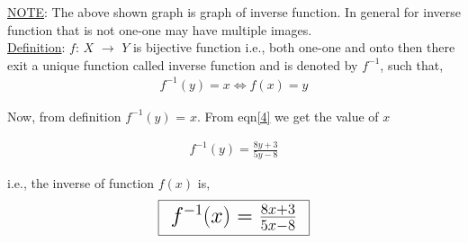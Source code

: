 \documentclass[journal,12pt,twocolumn]{IEEEtran}
\begin{document}
\noindent \underline{NOTE}: The above shown graph is graph of inverse function. In general for inverse function that is not one-one may have multiple images.\\

\noindent \underline{Definition}: $f$: $X$ $\rightarrow$ $Y$ is bijective function i.e., both one-one and onto then there exit a unique function called inverse function and is denoted by $f^{-1}$, such that,
\begin{align*}
f^{-1}(y)=x \iff f(x) = y
\end{align*}

\noindent Now, from definition $f^{-1}(y)$ = $x$. From eqn\eqref{4} we get the value of $x$ 

\begin{align*}
f^{-1}(y) = \frac{8y+3}{5y-8}
\end{align*}

i.e., the inverse of function $f(x)$ is,
\begin{align*}
\LARGE\framebox[1.2\width]{$f^{-1}(x)$ = $\frac{8x+3}{5x-8}$}
\end{align*}
\end{document}
